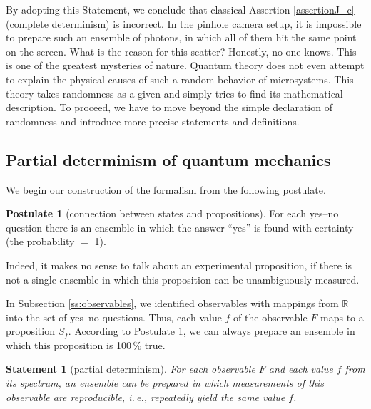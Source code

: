 \documentclass[nochecklpage]{stefan1}
\newtheorem{statement}[theorem]{Statement}
\theoremstyle{definition}
\newtheorem{postulate}[theorem]{Postulate}
\begin{document}
By adopting this Statement, we conclude that classical Assertion
\ref{assertionJ_c} (complete determinism) is incorrect. In the pinhole
camera setup, it is impossible to prepare such an ensemble of photons,
in which all of them hit the same point on the screen. What is the
reason for this scatter? Honestly, no one knows. This is one of the
greatest mysteries of nature. Quantum theory does not even attempt to
explain the physical causes of such a random behavior of microsystems.
This theory takes randomness as a given and simply tries to find its
mathematical description. To proceed, we have to move beyond the simple
declaration of randomness and introduce more precise statements and
definitions.

\subsection{Partial determinism of quantum mechanics}\label{sc:1.3.2}
We begin our construction of the formalism from the following postulate.

\begin{postulate}[connection between states and propositions]
\label{postulateJ}For each yes--no question there is an ensemble in which the answer
``yes'' is found with certainty (the probability $=$ 1).
\end{postulate}


Indeed, it makes no sense to talk about an experimental proposition, if there is not a single ensemble in which this proposition
can be unambiguously measured.

In Subsection \ref{ss:observables}, we identified observables with mappings
from $\mathbb{R}$ into the set of yes--no questions. Thus, each value
$f$ of the observable $F$ maps to a proposition $S_{f}$. According to
Postulate \ref{postulateJ}, we can always prepare an ensemble in which
this proposition is 100\,\% true.

\begin{statement}[partial determinism]
\label{postulateJ1}For each observable $ F $ and each value $ f $ from its spectrum, an
ensemble can be prepared in which measurements of this observable are
reproducible, i.\,e., repeatedly yield the same value $ f $.
\end{statement}
\end{document}
